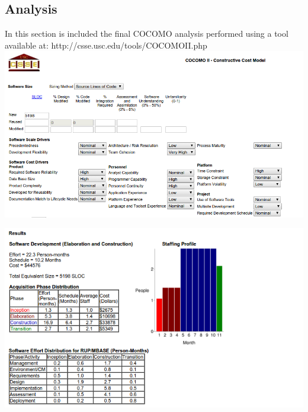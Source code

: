 \documentclass[11pt,titlepage]{article} %
\begin{document}
  \subsection{Analysis}
    In this section is included the final COCOMO analysis performed using a tool available at:\newline
    http://csse.usc.edu/tools/COCOMOII.php\newline
    \includegraphics[scale=0.5]{cocomo1.png}
    \newpage
    \begin{center}
      \includegraphics[scale=0.6]{cocomo2.png}
    \end{center}

\newpage
\end{document}

